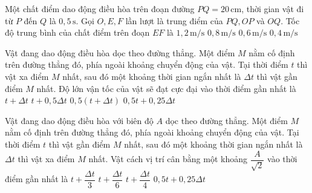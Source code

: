 \begin{ex}
Một chất điểm dao động điều hòa trên đoạn đường $PQ=20\,\mathrm{cm}$, thời gian vật đi từ $P$ đến $Q$ là $0,5\,\mathrm{s}$. Gọi $O,E,F$ lần lượt là trung điểm của $PQ,OP$ và $OQ$. Tốc độ trung bình của chất điểm trên đoạn $EF$ là
\choice
{$1,2\,\mathrm{m/s}$}
{$0,8\,\mathrm{m/s}$}
{\True $0,6\,\mathrm{m/s}$}
{$0,4\,\mathrm{m/s}$}
\end{ex}

\begin{ex}
Vật đang dao động điều hòa dọc theo đường thẳng. Một điểm $M$ nằm cố định trên đường thẳng đó, phía ngoài khoảng chuyển động của vật. Tại thời điểm $t$ thì vật xa điểm $M$ nhất, sau đó một khoảng thời gian ngắn nhất là $\Delta t$ thì vật gần điểm $M$ nhất. Độ lớn vận tốc của vật sẽ đạt cực đại vào thời điểm gần nhất là
\choice
{$t+\Delta t$}
{\True $t+0,5\Delta t$}
{$0,5(t+\Delta t)$}
{$0,5t+0,25\Delta t$}
\end{ex}

\begin{ex}
Vật đang dao động điều hòa với biên độ $A$ dọc theo đường thẳng. Một điểm $M$ nằm cố định trên đường thẳng đó, phía ngoài khoảng chuyển động của vật. Tại thời điểm $t$ thì vật gần điểm $M$ nhất, sau đó một khoảng thời gian ngắn nhất là $\Delta t$ thì vật xa điểm $M$ nhất. Vật cách vị trí cân bằng một khoảng $\dfrac{A}{\sqrt{2}}$ vào thời điểm gần nhất là
\choice
{$t+\dfrac{\Delta t}{3}$}
{$t+\dfrac{\Delta t}{6}$}
{\True $t+\dfrac{\Delta t}{4}$}
{$0,5t+0,25\Delta t$}
\end{ex}

